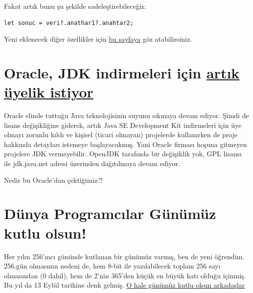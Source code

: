 \documentclass[11pt]{article}
\begin{document}
Fakat artık bunu şu şekilde sadeleştirebileceğiz:
\begin{verbatim}
let sonuc = veri?.anathar1?.anahtar2;
\end{verbatim}

Yeni eklenecek diğer özellikler için \href{https://github.com/microsoft/TypeScript/issues/33352}{bu sayfaya} göz atabilirsiniz.
\section{Oracle, JDK indirmeleri için \href{https://www.oracle.com/java/technologies/jdk8-downloads.html}{artık üyelik istiyor}}
\label{sec:orge375fda}
Oracle elinde tuttuğu Java teknolojisinin suyunu sıkmaya devam ediyor. Şimdi de
lisans değişikliğine giderek, artık Java SE Development Kit indirmeleri için
üye olmayı zorunlu kıldı ve kişisel (ticari olmayan) projelerde kullanırken de
proje hakkında detayları istemeye başlayacakmış. Yani Oracle firması hoşuna
gitmeyen projelere JDK vermeyebilir. OpenJDK tarafında bir değişiklik yok, GPL
lisansı ile jdk.java.net adresi üzerinden dağıtılmaya devam ediyor.

Nedir bu Oracle'dan çektiğimiz?!
\section{Dünya Programcılar Günümüz kutlu olsun!}
\label{sec:orge41122f}
Her yılın 256'ıncı gününde kutlanan bir günümüz varmış, ben de yeni öğrendim.
256.gün olmasının nedeni de, hem 8-bit ile yazılabilecek toplam 256 sayı
olmasından (0 dahil), hem de 2'nin 365'den küçük en büyük katı olduğu içinmiş.
Bu yıl da 13 Eylül tarihine denk gelmiş. \href{https://www.youtube.com/watch?v=QsxbbHG7KT8}{O hale günümüz kutlu olsun arkadaşlar}
\end{document}
